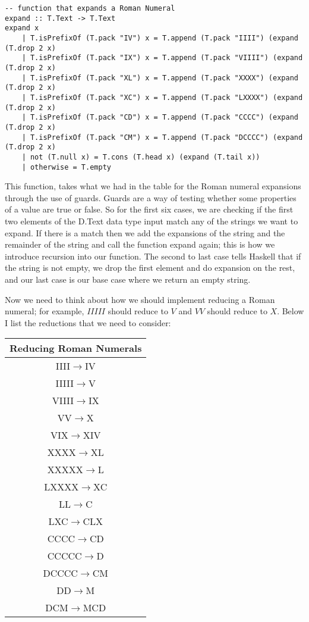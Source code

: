 \documentclass{article}
\begin{document}
\begin{lstlisting}
-- function that expands a Roman Numeral
expand :: T.Text -> T.Text
expand x
    | T.isPrefixOf (T.pack "IV") x = T.append (T.pack "IIII") (expand (T.drop 2 x)
    | T.isPrefixOf (T.pack "IX") x = T.append (T.pack "VIIII") (expand (T.drop 2 x)
    | T.isPrefixOf (T.pack "XL") x = T.append (T.pack "XXXX") (expand (T.drop 2 x)
    | T.isPrefixOf (T.pack "XC") x = T.append (T.pack "LXXXX") (expand (T.drop 2 x)
    | T.isPrefixOf (T.pack "CD") x = T.append (T.pack "CCCC") (expand (T.drop 2 x)
    | T.isPrefixOf (T.pack "CM") x = T.append (T.pack "DCCCC") (expand (T.drop 2 x)
    | not (T.null x) = T.cons (T.head x) (expand (T.tail x))
    | otherwise = T.empty
\end{lstlisting}

This function, takes what we had in the table for the Roman numeral expansions through the use of guards. Guards are a way of testing whether some properties of a value are true or false. So for the first six cases, we are checking if the first two elements of the D.Text data type input match any of the strings we want to expand. If there is a match then we add the expansions of the string and the remainder of the string and call the function expand again; this is how we introduce recursion into our function. The second to last case tells Haskell that if the string is not empty, we drop the first element and do expansion on the rest, and our last case is our base case where we return an empty string.

\vspace{\baselineskip}
Now we need to think about how we should implement reducing a Roman numeral; for example, $IIIII$ should reduce to $V$ and $VV$ should reduce to $X$. Below I list the reductions that we need to consider:
\begin{center}
\begin{tabular}{||c||} 
 \hline
 Reducing Roman Numerals \\ [0.5ex] 
 \hline
 IIII$\rightarrow$IV \\
 \hline
 IIIII$\rightarrow$V \\
 \hline
 VIIII$\rightarrow$IX \\
 \hline
 VV$\rightarrow$X \\
 \hline
 VIX$\rightarrow$XIV \\
 \hline
 XXXX$\rightarrow$XL \\
 \hline
 XXXXX$\rightarrow$L \\
 \hline
 LXXXX$\rightarrow$XC \\
 \hline
 LL$\rightarrow$C \\
 \hline
 LXC$\rightarrow$CLX \\
 \hline
 CCCC$\rightarrow$CD \\
 \hline
 CCCCC$\rightarrow$D \\
 \hline
 DCCCC$\rightarrow$CM \\
 \hline
 DD$\rightarrow$M \\
 \hline
 DCM$\rightarrow$MCD \\
 \hline
\end{tabular}
\end{center}
\end{document}
